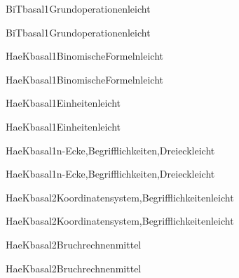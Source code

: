 \documentclass[12pt]{article}
\begin{document}
\pagecolor{lightgray!30}

\begin{Add}{BiT}{basal1}{Grundoperationen}{leicht}
\solution{ }
\end{Add}
\begin{Add}{BiT}{basal1}{Grundoperationen}{leicht}
\end{Add}

\begin{Add}{HaeK}{basal1}{BinomischeFormeln}{leicht}
\solution{ }
\end{Add}
\begin{Add}{HaeK}{basal1}{BinomischeFormeln}{leicht}
\end{Add}

\begin{Add}{HaeK}{basal1}{Einheiten}{leicht}
\solution{ }
\end{Add}
\begin{Add}{HaeK}{basal1}{Einheiten}{leicht}
\end{Add}

\begin{Add}{HaeK}{basal1}{n-Ecke,Begrifflichkeiten,Dreieck}{leicht}
\solution{ }
\end{Add}
\begin{Add}{HaeK}{basal1}{n-Ecke,Begrifflichkeiten,Dreieck}{leicht}
\end{Add}

\begin{Add}{HaeK}{basal2}{Koordinatensystem,Begrifflichkeiten}{leicht}
\solution{ }
\end{Add}
\begin{Add}{HaeK}{basal2}{Koordinatensystem,Begrifflichkeiten}{leicht}
\end{Add}

\begin{Add}{HaeK}{basal2}{Bruchrechnen}{mittel}
\solution{ }
\end{Add}
\begin{Add}{HaeK}{basal2}{Bruchrechnen}{mittel}
\end{Add}
\end{document}
